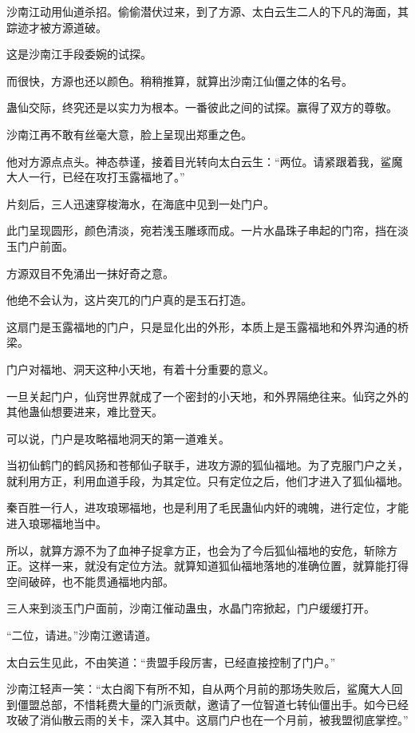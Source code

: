 \begin{this_body}
沙南江动用仙道杀招。偷偷潜伏过来，到了方源、太白云生二人的下凡的海面，其踪迹才被方源道破。

这是沙南江手段委婉的试探。

而很快，方源也还以颜色。稍稍推算，就算出沙南江仙僵之体的名号。

蛊仙交际，终究还是以实力为根本。一番彼此之间的试探。赢得了双方的尊敬。

沙南江再不敢有丝毫大意，脸上呈现出郑重之色。

他对方源点点头。神态恭谨，接着目光转向太白云生：“两位。请紧跟着我，鲨魔大人一行，已经在攻打玉露福地了。”

片刻后，三人迅速穿梭海水，在海底中见到一处门户。

此门呈现圆形，颜色清淡，宛若浅玉雕琢而成。一片水晶珠子串起的门帘，挡在淡玉门户前面。

方源双目不免涌出一抹好奇之意。

他绝不会认为，这片突兀的门户真的是玉石打造。

这扇门是玉露福地的门户，只是显化出的外形，本质上是玉露福地和外界沟通的桥梁。

门户对福地、洞天这种小天地，有着十分重要的意义。

一旦关起门户，仙窍世界就成了一个密封的小天地，和外界隔绝往来。仙窍之外的其他蛊仙想要进来，难比登天。

可以说，门户是攻略福地洞天的第一道难关。

当初仙鹤门的鹤风扬和苍郁仙子联手，进攻方源的狐仙福地。为了克服门户之关，就利用方正，利用血道手段，为其定位。只有定位之后，他们才进入了狐仙福地。

秦百胜一行人，进攻琅琊福地，也是利用了毛民蛊仙内奸的魂魄，进行定位，才能进入琅琊福地当中。

所以，就算方源不为了血神子捉拿方正，也会为了今后狐仙福地的安危，斩除方正。这样一来，就没有定位方法。就算知道狐仙福地落地的准确位置，就算能打得空间破碎，也不能贯通福地内部。

三人来到淡玉门户面前，沙南江催动蛊虫，水晶门帘掀起，门户缓缓打开。

“二位，请进。”沙南江邀请道。

太白云生见此，不由笑道：“贵盟手段厉害，已经直接控制了门户。”

沙南江轻声一笑：“太白阁下有所不知，自从两个月前的那场失败后，鲨魔大人回到僵盟总部，不惜耗费大量的门派贡献，邀请了一位智道七转仙僵出手。如今已经攻破了消仙散云雨的关卡，深入其中。这扇门户也在一个月前，被我盟彻底掌控。”


\end{this_body}
